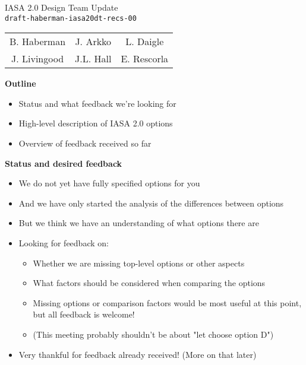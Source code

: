 \documentclass[helvetica]{seminar}
\newcommand{\heading}[1]{%
  \begin{center} 
    \large\bf 
    #1 
  \end{center} 
  \vspace{.4 in}}
\begin{document}
\begin{slide}
\begin{center}
\vspace{.5 in}
\LARGE{{\bf}IASA 2.0 Design Team Update\\{\small \verb^draft-haberman-iasa20dt-recs-00^}}\\
\vspace{.2in}
\large{
\begin{tabular}{ c c c }
B. Haberman & J. Arkko & L. Daigle \\
J. Livingood & J.L. Hall & E. Rescorla 
\end{tabular}
}
\end{center}
\end{slide}

\centerslidesfalse 

\begin{slide}
\heading{Outline}

\begin{itemize}
\item Status and what feedback we're looking for
\item High-level description of IASA 2.0 options
\item Overview of feedback received so far
\end{itemize}

\end{slide}


\begin{slide}

\heading{Status and desired feedback}

{\footnotesize
\begin{itemize}
\item We do not yet have fully specified options for you
\item And we have only started the analysis of the differences between options
\item But we think we have an understanding of what options there are
\item Looking for feedback on:
  \begin{itemize}
  \item Whether we are missing top-level options or other aspects
  \item What factors should be considered when comparing the options
  \item Missing options or comparison factors would be most useful at this point, but all feedback is welcome!
  \item (This meeting probably shouldn't be about "let choose option D")
  \end{itemize}
\item Very thankful for feedback already received! (More on that later)
\end{itemize}
}
\end{slide}
\end{document}
